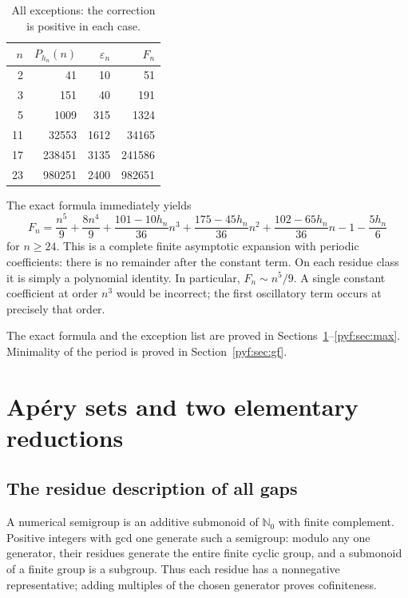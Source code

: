 \documentclass[11pt,a4paper]{article}
\numberwithin{equation}{section}
\theoremstyle{definition}
\newcommand{\N}{\mathbb N_0}
\newcommand{\eps}{\varepsilon}
\begin{document}
\begin{table}[ht]
\centering
\caption{All exceptions: the correction is positive in each case.}\label{pyf:tab:exceptions}
\begin{tabular}{rrrr}
\toprule
$n$ & $P_{h_n}(n)$ & $\eps_n$ & $F_n$\\
\midrule
2 & 41 & 10 & 51\\
3 & 151 & 40 & 191\\
5 & 1009 & 315 & 1324\\
11 & 32553 & 1612 & 34165\\
17 & 238451 & 3135 & 241586\\
23 & 980251 & 2400 & 982651\\
\bottomrule
\end{tabular}
\end{table}

The exact formula immediately yields
\begin{equation}\label{pyf:eq:asympF}
F_n=\frac{n^5}{9}+\frac{8n^4}{9}
 +\frac{101-10h_n}{36}n^3
 +\frac{175-45h_n}{36}n^2
 +\frac{102-65h_n}{36}n-1-\frac{5h_n}{6}
\end{equation}
for $n\geq24$. This is a complete finite asymptotic expansion with periodic
coefficients: there is no remainder after the constant term. On each residue
class it is simply a polynomial identity. In particular,
$F_n\sim n^5/9$. A single constant coefficient at order $n^3$ would be
incorrect; the first oscillatory term occurs at precisely that order.

The exact formula and the exception list are proved in
Sections~\ref{pyf:sec:reduction}--\ref{pyf:sec:max}. Minimality of the period is
proved in Section~\ref{pyf:sec:gf}.

\section{Ap\'ery sets and two elementary reductions}\label{pyf:sec:reduction}

\subsection{The residue description of all gaps}

A numerical semigroup is an additive submonoid of $\N$ with finite
complement. Positive integers with gcd one generate such a semigroup:
modulo any one generator, their residues generate the entire finite cyclic
group, and a submonoid of a finite group is a subgroup. Thus each residue
has a nonnegative representative; adding multiples of the chosen generator
proves cofiniteness.
\end{document}

